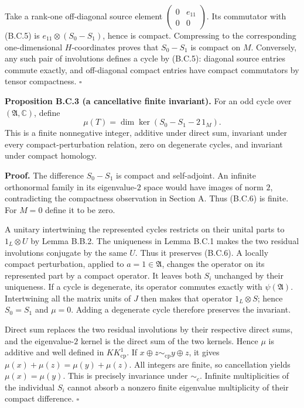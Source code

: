 \documentclass[
  11pt,
]{article}
\begin{document}
Take a rank-one off-diagonal source element
\(\left(\begin{smallmatrix}0&e_{11}\\0&0\end{smallmatrix}\right)\). Its
commutator with (B.C.5) is \(e_{11}\otimes(S_0-S_1)\), hence is compact.
Compressing to the corresponding one-dimensional \(H\)-coordinates
proves that \(S_0-S_1\) is compact on \(M\). Conversely, any such pair
of involutions defines a cycle by (B.C.5): diagonal source entries
commute exactly, and off-diagonal compact entries have compact
commutators by tensor compactness. \(\square\)

\textbf{Proposition B.C.3 (a cancellative finite invariant).} For an odd
cycle over \((\mathfrak A,\mathbb C)\), define \[
\mu(T)=\dim\ker(S_0-S_1-2\,1_M).
\tag{B.C.6}
\] This is a finite nonnegative integer, additive under direct sum,
invariant under every compact-perturbation relation, zero on degenerate
cycles, and invariant under compact homology.

\textbf{Proof.} The difference \(S_0-S_1\) is compact and self-adjoint.
An infinite orthonormal family in its eigenvalue-\(2\) space would have
images of norm \(2\), contradicting the compactness observation in
Section A. Thus (B.C.6) is finite. For \(M=0\) define it to be zero.

A unitary intertwining the represented cycles restricts on their unital
parts to \(1_L\otimes U\) by Lemma B.B.2. The uniqueness in Lemma B.C.1
makes the two residual involutions conjugate by the same \(U\). Thus it
preserves (B.C.6). A locally compact perturbation, applied to
\(a=1\in\mathfrak A\), changes the operator on its represented part by a
compact operator. It leaves both \(S_i\) unchanged by their uniqueness.
If a cycle is degenerate, its operator commutes exactly with
\(\psi(\mathfrak A)\). Intertwining all the matrix units of \(J\) then
makes that operator \(1_L\otimes S\); hence \(S_0=S_1\) and \(\mu=0\).
Adding a degenerate cycle therefore preserves the invariant.

Direct sum replaces the two residual involutions by their respective
direct sums, and the eigenvalue-\(2\) kernel is the direct sum of the
two kernels. Hence \(\mu\) is additive and well defined in
\(KK_{\mathrm{cp}}^1\). If \(x\oplus z\sim_{\mathrm{cp}}y\oplus z\), it
gives \(\mu(x)+\mu(z)=\mu(y)+\mu(z)\). All integers are finite, so
cancellation yields \(\mu(x)=\mu(y)\). This is precisely invariance
under \(\sim_c\). Infinite multiplicities of the individual \(S_i\)
cannot absorb a nonzero finite eigenvalue multiplicity of their compact
difference. \(\square\)
\end{document}
